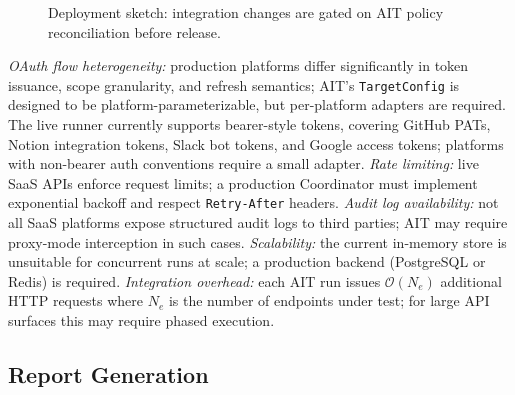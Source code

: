 \documentclass[conference]{IEEEtran}
\begin{document}
\begin{figure}[htbp]
  \centering
  \caption{Deployment sketch: integration changes are gated on AIT policy
  reconciliation before release.}
  \label{fig:cicd}
\end{figure}

\emph{OAuth flow heterogeneity:} production platforms
differ significantly in token issuance, scope granularity, and
refresh semantics; AIT's \texttt{TargetConfig} is designed to be
platform-parameterizable, but per-platform adapters are required.
The live runner currently supports bearer-style tokens, covering
GitHub PATs, Notion integration tokens, Slack bot tokens, and
Google access tokens; platforms with non-bearer auth conventions
require a small adapter.
\emph{Rate limiting:} live SaaS APIs enforce request limits; a
production Coordinator must implement exponential backoff and
respect \texttt{Retry-After} headers. \emph{Audit log availability:}
not all SaaS platforms expose structured audit logs to third parties;
AIT may require proxy-mode interception in such cases.
\emph{Scalability:} the current in-memory store is unsuitable for
concurrent runs at scale; a production backend (PostgreSQL or Redis)
is required. \emph{Integration overhead:} each AIT run issues
$\mathcal{O}(N_e)$ additional HTTP requests where $N_e$ is the
number of endpoints under test; for large API surfaces this may
require phased execution.

\subsection{Report Generation}
\end{document}
